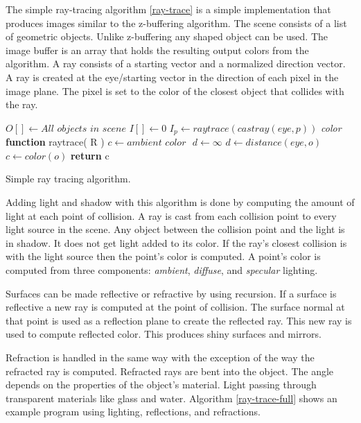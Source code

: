 The simple ray-tracing algorithm \ref{ray-trace} is a simple implementation that produces images similar to the z-buffering algorithm.  The scene consists of a list of geometric objects.  Unlike z-buffering any shaped object can be used.  The image buffer is an array that holds the resulting output colors from the algorithm.  A ray consists of a starting vector and a normalized direction vector.  A ray is created at the eye/starting vector in the direction of each pixel in the image plane.  The pixel is set to the color of the closest object that collides with the ray.  

\begin{algorithm}[H]
\begin{algorithmic}[1]
\STATE $O[ ] \gets \textit{All objects in scene}$ 
\STATE $I[] \gets 0$ 
\STATE
{}
	\STATE $I_{p} \gets raytrace( castray( eye, p ))$
\ENDFOR
\STATE 
\STATE \textit{color} \textbf{function} raytrace(  R )
	\STATE $c  \gets \textit{ambient color } $
	\STATE $d \gets \infty $
				\STATE $d \gets distance( \textit{eye}, o )$
				\STATE $c \gets color( o )$
			\ENDIF
		\ENDIF
	\ENDFOR
	\STATE \textbf{return} c

\end{algorithmic}
\caption{Simple ray tracing algorithm.}
\label{ray-trace}
\end{algorithm}

Adding light and shadow with this algorithm is done by computing the amount of light at each point of collision.  A ray is cast from each collision point to every light source in the scene.  Any object between the collision point and the light is in shadow.   It does not get light added to its color. If the ray's closest collision is with the light source then the point's color is computed.  A point's color is computed from three components: \textit{ambient}, \textit{diffuse}, and \textit{specular} lighting\cite{kalinini:2008}.

Surfaces can be made reflective or refractive by using recursion.  If a surface is reflective a new ray is computed at the point of collision.   The surface normal at that point  is used as a reflection plane to create the reflected ray.  This new ray is used to compute reflected color.  This produces shiny surfaces and mirrors.  

Refraction is handled in the same way with the exception of the way the refracted ray is computed.  Refracted rays are bent into the object.  The angle depends on the properties of the object's material.  Light passing through transparent materials like glass and water. Algorithm \ref{ray-trace-full} shows an example program using lighting, reflections, and refractions.
  
